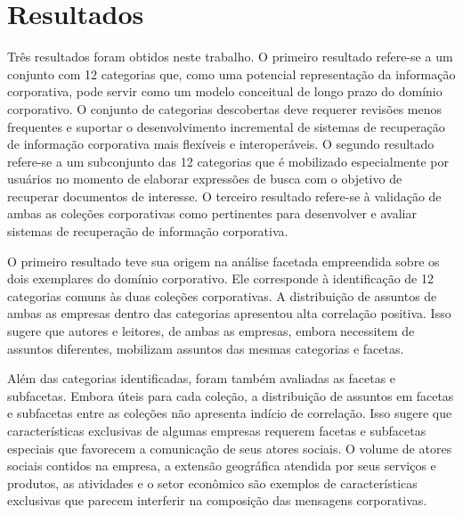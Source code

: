 \section{Resultados}
\label{conclusao-resultados}

Três resultados foram obtidos neste trabalho. O primeiro resultado refere-se a um conjunto com 12 categorias que, como uma potencial representação da informação corporativa, pode servir como um modelo conceitual de longo prazo do domínio corporativo. O conjunto de categorias descobertas deve requerer revisões menos frequentes e suportar o desenvolvimento incremental de sistemas de recuperação de informação corporativa mais flexíveis e interoperáveis. O segundo resultado refere-se a um subconjunto das 12 categorias que é mobilizado especialmente por usuários no momento de elaborar expressões de busca com o objetivo de recuperar documentos de interesse.
O terceiro resultado refere-se à validação de ambas as coleções corporativas como pertinentes para desenvolver e avaliar sistemas de recuperação de informação corporativa.

O primeiro resultado teve sua origem na análise facetada empreendida sobre os dois exemplares do domínio corporativo. Ele corresponde à identificação de 12 categorias comuns às duas coleções corporativas. A distribuição de assuntos de ambas as empresas dentro das categorias apresentou alta correlação positiva. Isso sugere que autores e leitores, de ambas as empresas, embora necessitem de assuntos diferentes, mobilizam assuntos das mesmas categorias e facetas.

Além das categorias identificadas, foram também avaliadas as facetas e subfacetas. Embora úteis para cada coleção, a distribuição de assuntos em facetas e subfacetas entre as coleções não apresenta indício de correlação. Isso sugere que características exclusivas de algumas empresas requerem facetas e subfacetas especiais que favorecem a comunicação de seus atores sociais. O volume de atores sociais contidos na empresa, a extensão geográfica atendida por seus serviços e produtos, as atividades e o setor econômico são exemplos de características exclusivas que parecem interferir na composição das mensagens corporativas.

